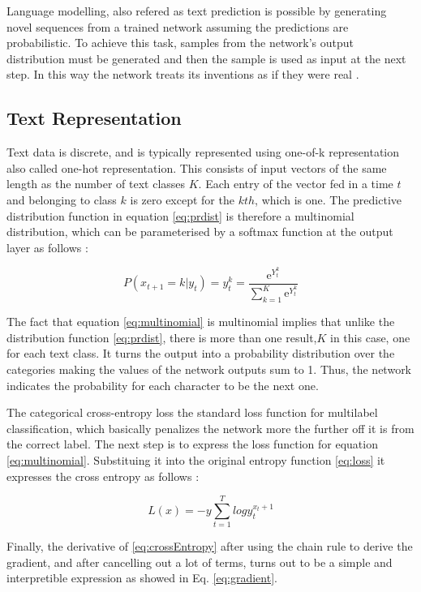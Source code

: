 Language modelling, also refered as text prediction is possible by generating novel sequences from a trained network assuming the predictions are probabilistic. To achieve this task, samples from the network's output distribution must be generated and then the sample is used as input at the next step. In this way the network treats its inventions as if they were real \cite{graves2013generating}.

\subsection{Text Representation}
Text data is discrete, and is typically represented using one-of-k representation also called one-hot representation. This consists of input vectors of the same length as the number of text classes $K$. Each entry of the vector fed in a time $t$ and belonging to class $k$ is zero except for the $kth$, which is one. The predictive distribution function in equation \ref{eq:prdist} is therefore a multinomial distribution, which can be parameterised by a softmax function at the output layer as follows \cite{graves2013generating}:

\begin{equation} \label{eq:multinomial}
P(x_{t+1}=k|y_t)=y^k_t=\frac{\mathrm{e}^{Y^k_t}}{ \sum_{k=1}^{K} \mathrm{e}^{Y^k_t}}
\end{equation}

The fact that equation \ref{eq:multinomial} is multinomial implies that unlike the distribution function \ref{eq:prdist}, there is more than one result,$K$ in this case, one for each text class.  It turns the output into a probability distribution over the categories making the values of the network outputs sum to 1. Thus, the network indicates the probability for each character to be the next one.

The categorical cross-entropy loss the standard loss function for multilabel classification, which basically penalizes the network more the further off it is from the correct label. The next step is to express the loss function for equation \ref{eq:multinomial}. Substituing it into the original entropy function \ref{eq:loss} it expresses the cross entropy as follows \cite{graves2013generating}:

\begin{equation} \label{eq:crossEntropy}
L(x)=-y \sum_{t=1}^{T} log y^{x_t+1}_t
\end{equation}

Finally, the derivative of \ref{eq:crossEntropy} after using the chain rule to derive the gradient, and after cancelling out a lot of terms, turns out to be a simple and interpretible expression as showed in Eq. \ref{eq:gradient}.

